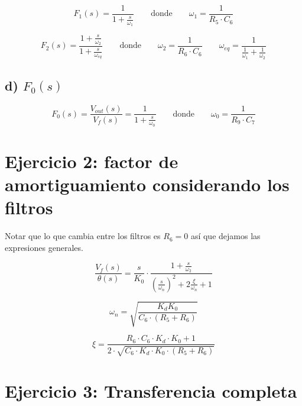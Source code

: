 \documentclass{article}
\begin{document}
\begin{equation} \label{f1_eqn}
F_1(s) = \frac{1}{ 1 + \frac{s}{\omega_1}
}
\qquad \text{donde} \qquad \omega_1=\frac{1}{R_5\cdot C_6} 
\end{equation}


\begin{equation} \label{f2_eqn}
F_2(s) = \frac{1+\frac{s}{\omega_2}}{ 1 + \frac{s}{\omega_{eq}}} \qquad \text{donde} \qquad \omega_2=\frac{1}{R_6\cdot C_6} \qquad \omega_{eq} = \frac{1}{\frac{1}{\omega_1} + \frac{1}{\omega_2}} 
\end{equation}


\subsection*{d) $F_0(s)$}

\begin{equation} \label{fo_eqn}
F_0(s) = \frac{V_{out}(s)}{V_f(s)} = \frac{1}{ 1 + \frac{s}{\omega_0}} \qquad \text{donde} \qquad \omega_0=\frac{1}{R_9\cdot C_7}
\end{equation}


\section*{Ejercicio 2: factor de amortiguamiento considerando los filtros}

Notar que lo que cambia entre los filtros es $R_6 = 0$ así que dejamos las expresiones generales.

\begin{equation} \label{vftheta_eqn}
\frac{V_f(s)}{\theta(s)} = \frac{ s}{K_0}
\cdot \frac{ 1 + \frac{s}{\omega_2} }
{ \left(\frac{s}{\omega_n}\right)^2 + 2\frac{\xi}{\omega_n}  + 1}
\end{equation}

\begin{equation} \label{wn_eqn}
\omega_n = \sqrt{\frac{K_d K_0}{C_6\cdot(R_5+R_6)}}
\end{equation}


\begin{equation} \label{xi_eqn}
\xi = \frac{R_6 \cdot C_6\cdot K_d\cdot K_0  + 1}
{2\cdot \sqrt{C_6 \cdot K_d \cdot K_0 \cdot(R_5 + R_6)}}
\end{equation}

\section*{Ejercicio 3: Transferencia completa}
\end{document}
